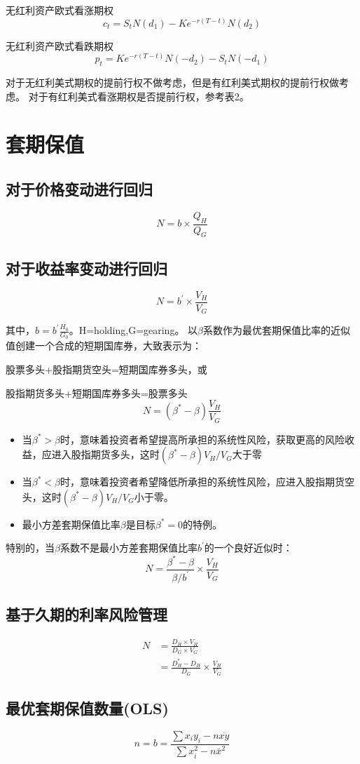 \documentclass{article}
\begin{document}
无红利资产欧式看涨期权
\[c_t=S_tN(d_1)-Ke^{-r(T-t)}N(d_2)\]

无红利资产欧式看跌期权
\[p_t=Ke^{-r(T-t)}N(-d_2)-S_tN(-d_1)\]

对于无红利美式期权的提前行权不做考虑，但是有红利美式期权的提前行权做考虑。
对于有红利美式看涨期权是否提前行权，参考表2。

\clearpage
\section{套期保值}
\subsection{对于价格变动进行回归}
\[N=b\times\frac{Q_H}{Q_G}\]
\subsection{对于收益率变动进行回归}
\[N=b^{'}\times\frac{V_H}{V_G}\]

其中，$b=b^{'}\frac{H_0}{G_0}$。H=holding,G=gearing。
以$\beta$系数作为最优套期保值比率的近似值创建一个合成的短期国库券，大致表示为：

股票多头+股指期货空头=短期国库券多头，或

股指期货多头+短期国库券多头=股票多头
\[N=(\beta^{*}-\beta)\frac{V_H}{V_G}\]
\begin{itemize}
    \item 当$\beta^{*}>\beta$时，意味着投资者希望提高所承担的系统性风险，获取更高的风险收益，应进入股指期货多头，这时$(\beta^{*}-\beta)V_H/V_G$大于零
    \item 当$\beta^{*}<\beta$时，意味着投资者希望降低所承担的系统性风险，应进入股指期货空头，这时$(\beta^{*}-\beta)V_H/V_G$小于零。
    \item 最小方差套期保值比率$\beta$是目标$\beta^{*}=0$的特例。
\end{itemize}

特别的，当$\beta$系数不是最小方差套期保值比率$b^{'}$的一个良好近似时：
\[N=\frac{\beta^{*}-\beta}{\beta /b^{'}} \times \frac{V_H}{V_G}\]

\subsection{基于久期的利率风险管理}
\begin{align}
    N&=\frac{D_H\times V_H}{D_G\times V_G}\nonumber\\
    &=\frac{D_H^{*}-D_H}{D_G}\times\frac{V_H}{V_G} \nonumber
\end{align}

\subsection{最优套期保值数量(OLS)}
\[n=b=\frac{\sum x_i y_i-n \overline{x y}}{\sum x_i^2-n \bar{x}^2}\]
\end{document}
